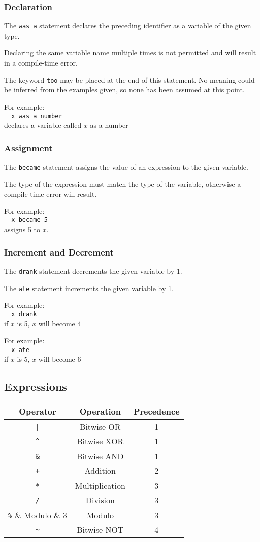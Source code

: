 \documentclass[a4wide, 11pt]{article}
\begin{document}
\subsubsection{Declaration}
The \verb:was a: statement declares the preceding identifier as a variable of
the given type.

Declaring the same variable name multiple times is not permitted and will
result in a compile-time error.

The keyword \verb:too: may be placed at the end of this statement. No meaning
could be inferred from the examples given, so none has been assumed at this point.

For example:\\
\verb:  x was a number:\\
declares a variable called $x$ as a number

\subsubsection{Assignment}
The \verb:became: statement assigns the value of an expression to the given
variable.

The type of the expression must match the type of the variable, otherwise a
compile-time error will result.

For example:\\
\verb:  x became 5:\\
assigns 5 to $x$.

\subsubsection{Increment and Decrement}
The \verb:drank: statement decrements the given variable by 1.

The \verb:ate: statement increments the given variable by 1.

For example:\\
\verb:  x drank:\\
if $x$ is 5, $x$ will become 4

For example:\\
\verb:  x ate:\\
if $x$ is 5, $x$ will become 6

\subsection{Expressions}
\begin{tabular}{ccc}
Operator & Operation   & Precedence \\
\hline
\hline
\verb:|: & Bitwise OR  & 1 \\
\verb:^: & Bitwise XOR & 1 \\
\verb:&: & Bitwise AND & 1 \\
\hline
\verb:+: & Addition    & 2 \\
\hline
\verb:*: & Multiplication & 3 \\
\verb:/: & Division       & 3 \\
\verb:%: & Modulo         & 3 \\
\hline
\verb:~: & Bitwise NOT    & 4 \\
\end{tabular}
\end{document}
